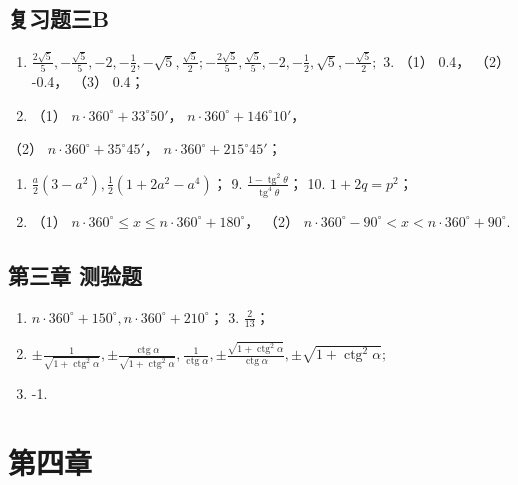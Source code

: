 \subsection{复习题三B}

\begin{enumerate}
\item
  \(\frac{2\sqrt{5}}{5}, -\frac{\sqrt{5}}{5}, -2, -\frac{1}{2}, -\sqrt{5}, \frac{\sqrt{5}}{2}; -\frac{2\sqrt{5}}{5}, \frac{\sqrt{5}}{5}, -2, -\frac{1}{2}, \sqrt{5}, -\frac{\sqrt{5}}{2};\)
  3. （1） 0.4， （2） -0.4， （3） 0.4；
\item
  （1） \(n \cdot 360^{\circ} + 33^{\circ}50'\)，
  \(n \cdot 360^{\circ} + 146^{\circ}10'\)，
\end{enumerate}

（2） \(n \cdot 360^{\circ} + 35^{\circ}45'\)，
\(n \cdot 360^{\circ} + 215^{\circ}45'\)；

\begin{enumerate}[start=6]
\item
  \(\frac{a}{2} (3 - a^2), \frac{1}{2} (1 + 2a^2 - a^4)\)； 9.
  \(\frac{1 - \operatorname{tg}^2 \theta}{\operatorname{tg}^4 \theta}\)；
  10. \(1 + 2q = p^2\)；
\item
  （1）
  \(n \cdot 360^{\circ} \leqslant x \leqslant n \cdot 360^{\circ} + 180^{\circ}\)，
  （2）
  \(n \cdot 360^{\circ} - 90^{\circ} < x < n \cdot 360^{\circ} + 90^{\circ}\).
\end{enumerate}

\subsection{第三章 测验题}

\begin{enumerate}
\item
  \(n \cdot 360^{\circ} + 150^{\circ}, n \cdot 360^{\circ} + 210^{\circ}\)；
  3. \(\frac{2}{13}\)；
\item
  \(\pm \frac{1}{\sqrt{1 + \operatorname{ctg}^2\alpha}}, \pm \frac{\operatorname{ctg}\alpha}{\sqrt{1 + \operatorname{ctg}^2\alpha}}, \frac{1}{\operatorname{ctg}\alpha}, \pm \frac{\sqrt{1 + \operatorname{ctg}^2\alpha}}{\operatorname{ctg}\alpha}, \pm \sqrt{1 + \operatorname{ctg}^2\alpha};\)
\item
  -1.
\end{enumerate}

\section{第四章}

